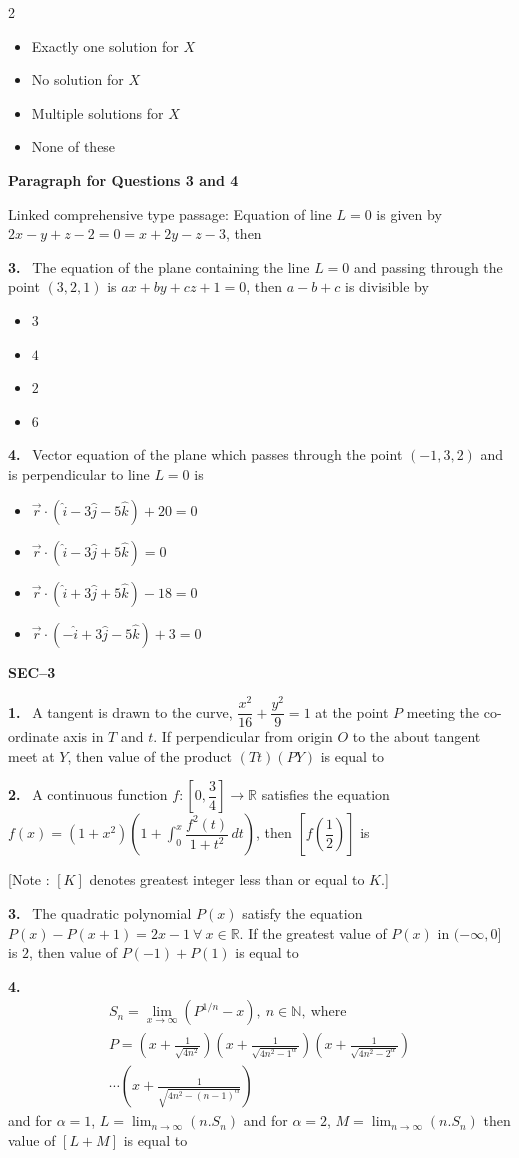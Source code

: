 \documentclass[10pt]{extarticle}
\newcommand{\sect}[1]{\par\smallskip\noindent\textbf{#1}\par}
\newcommand{\qn}[1]{\par\smallskip\noindent\textbf{#1.}~}
\newcommand{\paraq}[2]{\par\smallskip\noindent\textbf{Paragraph for Questions #1 and #2}\par}
\newenvironment{qoptions}{\begin{itemize}[leftmargin=1.8em,itemsep=1pt,topsep=2pt,label={}]}{\end{itemize}}
\newcommand{\opt}[2]{\item[(#1)] #2}
\begin{document}
\begin{multicols}{2}
\begin{qoptions}
\opt{A}{Exactly one solution for $X$}
\opt{B}{No solution for $X$}
\opt{C}{Multiple solutions for $X$}
\opt{D}{None of these}
\end{qoptions}
\paraq{3}{4}
Linked comprehensive type passage: Equation of line $L=0$ is given by $2x-y+z-2=0=x+2y-z-3$, then
\qn{3} The equation of the plane containing the line $L=0$ and passing through the point $(3,2,1)$ is $ax+by+cz+1=0$, then $a-b+c$ is divisible by
\begin{qoptions}
\opt{A}{$3$}
\opt{B}{$4$}
\opt{C}{$2$}
\opt{D}{$6$}
\end{qoptions}
\qn{4} Vector equation of the plane which passes through the point $(-1,3,2)$ and is perpendicular to line $L=0$ is
\begin{qoptions}
\opt{A}{$\vec r\cdot\left(\hat i-3\hat j-5\hat k\right)+20=0$}
\opt{B}{$\vec r\cdot\left(\hat i-3\hat j+5\hat k\right)=0$}
\opt{C}{$\vec r\cdot\left(\hat i+3\hat j+5\hat k\right)-18=0$}
\opt{D}{$\vec r\cdot\left(-\hat i+3\hat j-5\hat k\right)+3=0$}
\end{qoptions}
\sect{SEC--3}
\qn{1} A tangent is drawn to the curve, $\dfrac{x^2}{16}+\dfrac{y^2}{9}=1$ at the point $P$ meeting the co-ordinate axis in $T$ and $t$. If perpendicular from origin $O$ to the about tangent meet at $Y$, then value of the product $(Tt)(PY)$ is equal to
\qn{2} A continuous function $f:\left[0,\dfrac34\right]\to\mathbb R$ satisfies the equation $f(x)=\left(1+x^2\right)\left(1+\displaystyle\int_0^x\dfrac{f^2(t)}{1+t^2}\,dt\right)$, then $\left[f\left(\dfrac12\right)\right]$ is

[Note : $[K]$ denotes greatest integer less than or equal to $K$.]
\qn{3} The quadratic polynomial $P(x)$ satisfy the equation $P(x)-P(x+1)=2x-1\ \forall\ x\in\mathbb R$. If the greatest value of $P(x)$ in $(-\infty,0]$ is $2$, then value of $P(-1)+P(1)$ is equal to
\qn{4}
{\small\begin{gather*}
S_n=\lim_{x\to\infty}\left(P^{1/n}-x\right),\ n\in\mathbb N,\ \text{where}\\
P=\left(x+\tfrac1{\sqrt{4n^2}}\right)\left(x+\tfrac1{\sqrt{4n^2-1^\alpha}}\right)\left(x+\tfrac1{\sqrt{4n^2-2^\alpha}}\right)\\
\cdots\left(x+\tfrac1{\sqrt{4n^2-(n-1)^\alpha}}\right)
\end{gather*}}
and for $\alpha=1$, $L=\displaystyle\lim_{n\to\infty}(n.S_n)$ and for $\alpha=2$, $M=\displaystyle\lim_{n\to\infty}(n.S_n)$ then value of $[L+M]$ is equal to


\end{multicols}
\end{document}
